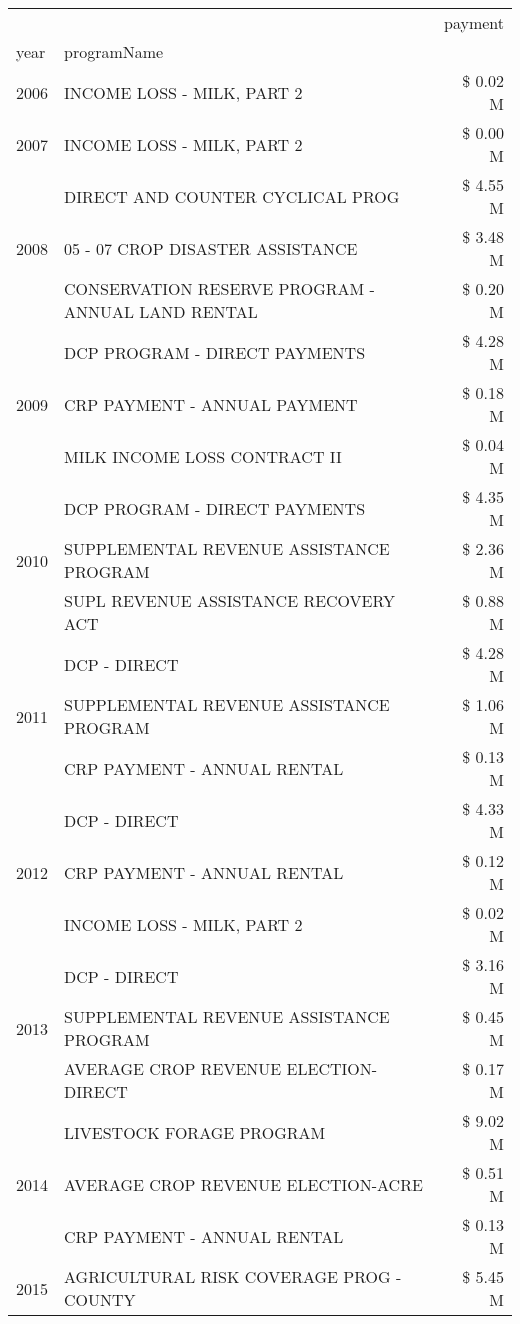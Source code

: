 \begin{tabular}{llr}
\toprule
 &  & payment \\
year & programName &  \\
\midrule
2006 & INCOME LOSS - MILK, PART 2 & \$ 0.02 M \\
\cline{1-3}
2007 & INCOME LOSS - MILK, PART 2 & \$ 0.00 M \\
\cline{1-3}
\multirow[t]{3}{*}{2008} & DIRECT AND COUNTER CYCLICAL PROG & \$ 4.55 M \\
 & 05 - 07 CROP DISASTER ASSISTANCE & \$ 3.48 M \\
 & CONSERVATION RESERVE PROGRAM - ANNUAL LAND RENTAL & \$ 0.20 M \\
\cline{1-3}
\multirow[t]{3}{*}{2009} & DCP PROGRAM - DIRECT PAYMENTS & \$ 4.28 M \\
 & CRP PAYMENT - ANNUAL PAYMENT & \$ 0.18 M \\
 & MILK INCOME LOSS CONTRACT II & \$ 0.04 M \\
\cline{1-3}
\multirow[t]{3}{*}{2010} & DCP PROGRAM - DIRECT PAYMENTS & \$ 4.35 M \\
 & SUPPLEMENTAL REVENUE ASSISTANCE PROGRAM & \$ 2.36 M \\
 & SUPL REVENUE ASSISTANCE RECOVERY ACT & \$ 0.88 M \\
\cline{1-3}
\multirow[t]{3}{*}{2011} & DCP - DIRECT & \$ 4.28 M \\
 & SUPPLEMENTAL REVENUE ASSISTANCE PROGRAM & \$ 1.06 M \\
 & CRP PAYMENT - ANNUAL RENTAL & \$ 0.13 M \\
\cline{1-3}
\multirow[t]{3}{*}{2012} & DCP - DIRECT & \$ 4.33 M \\
 & CRP PAYMENT - ANNUAL RENTAL & \$ 0.12 M \\
 & INCOME LOSS - MILK, PART 2 & \$ 0.02 M \\
\cline{1-3}
\multirow[t]{3}{*}{2013} & DCP - DIRECT & \$ 3.16 M \\
 & SUPPLEMENTAL REVENUE ASSISTANCE PROGRAM & \$ 0.45 M \\
 & AVERAGE CROP REVENUE ELECTION-DIRECT & \$ 0.17 M \\
\cline{1-3}
\multirow[t]{3}{*}{2014} & LIVESTOCK FORAGE PROGRAM & \$ 9.02 M \\
 & AVERAGE CROP REVENUE ELECTION-ACRE & \$ 0.51 M \\
 & CRP PAYMENT - ANNUAL RENTAL & \$ 0.13 M \\
\cline{1-3}
\multirow[t]{3}{*}{2015} & AGRICULTURAL RISK COVERAGE PROG - COUNTY & \$ 5.45 M \\

\end{tabular}

